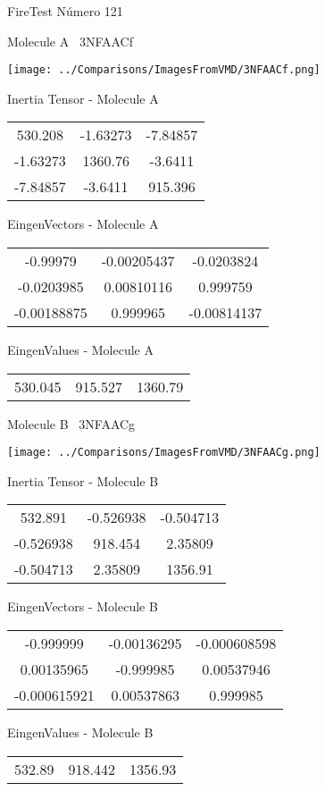\vtab[-3cm]
\begin{center}
{\large FireTest \tab Número 121}
\end{center}
\begin{multicols}{2}
\begin{center}

Molecule A \
3NFAACf

\texttt{[image: ../Comparisons/ImagesFromVMD/3NFAACf.png]}

Inertia Tensor - Molecule A \\
\begin{tabular}{|c c c|}
530.208	 & 	-1.63273	 & 	-7.84857	 \\
-1.63273	 & 	1360.76	 & 	-3.6411	 \\
-7.84857	 & 	-3.6411	 & 	915.396
\end{tabular}

\vtab
 EingenVectors - Molecule A     \\
\begin{tabular}{|c c c|}
-0.99979	 & 	-0.00205437	 & 	-0.0203824	 \\
-0.0203985	 & 	0.00810116	 & 	0.999759	 \\
-0.00188875	 & 	0.999965	 & 	-0.00814137
\end{tabular}

\vtab
 EingenValues - Molecule A     \\
\begin{tabular}{|c c c|}
530.045	 & 	915.527	 & 	1360.79	 \\
\end{tabular}
\columnbreak

Molecule B \
3NFAACg

\texttt{[image: ../Comparisons/ImagesFromVMD/3NFAACg.png]}

Inertia Tensor - Molecule B \\
\begin{tabular}{|c c c|}
532.891	 & 	-0.526938	 & 	-0.504713	 \\
-0.526938	 & 	918.454	 & 	2.35809	 \\
-0.504713	 & 	2.35809	 & 	1356.91
\end{tabular}

\vtab
 EingenVectors - Molecule B     \\
\begin{tabular}{|c c c|}
-0.999999	 & 	-0.00136295	 & 	-0.000608598	 \\
0.00135965	 & 	-0.999985	 & 	0.00537946	 \\
-0.000615921	 & 	0.00537863	 & 	0.999985
\end{tabular}

\vtab
 EingenValues - Molecule B     \\
\begin{tabular}{|c c c|}
532.89	 & 	918.442	 & 	1356.93	 \\
\end{tabular}

\end{center}
\end{multicols}

